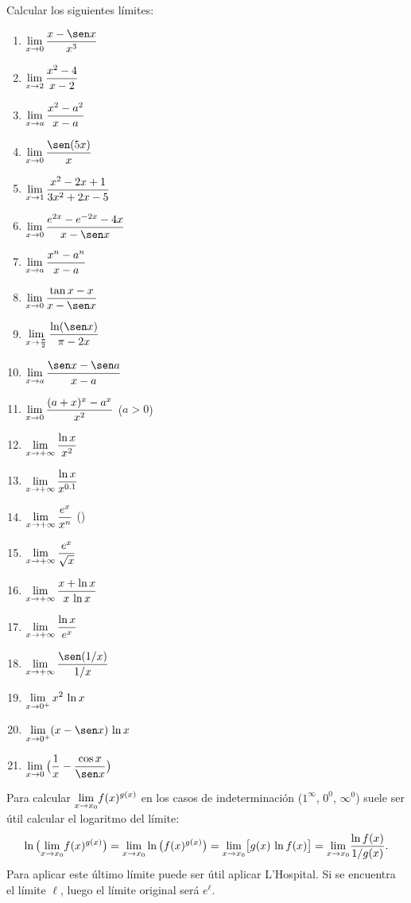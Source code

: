 \item Calcular los siguientes límites:
\begin{multicols}{2}
  \begin{enumerate}
    \item $\D \lim_{x\to 0} \frac{x-\sen x}{x^3}$
    \item $\displaystyle \lim_{x\to 2} \frac{x^2-4}{x-2}$
    \item $\displaystyle \lim_{x\to a} \frac{x^2-a^2}{x-a} $
    \item $\D \lim_{x\to 0} \frac{\sen (5x)}x$
    \item $\displaystyle \lim_{x\to 1} \frac{x^2-2x+1}{3x^2+2x-5} $
    \item $\D \lim_{x\to 0} \frac{e^{2x}-e^{-2x}-4x}{x-\sen x}$
    \item $\displaystyle \lim_{x\to a} \frac{x^n-a^n}{x-a}$
    \item $\D \lim_{x\to 0} \frac{\tan x-x}{x-\sen x}$
    \item $\D \lim_{x\to \frac\pi2} \frac{\ln(\sen x)}{\pi -2x}$
    \item $\D \lim_{x\to a} \frac{\sen x - \sen a}{x-a}$
    \item $\displaystyle \lim_{x\to 0} \frac{(a+x)^x-a^x}{x^2}$ ($a>0$)
    \item $\displaystyle \lim_{x\to +\infty} \frac{\ln x}{x^2}$
    \item $\displaystyle \lim_{x\to +\infty} \frac{\ln x}{x^{0.1}}$
    \item $\displaystyle \lim_{x\to +\infty} \frac{e^x}{x^n}$ (\niN)
    \item $\displaystyle \lim_{x\to +\infty} \frac{e^x}{\sqrt{x}}$
    \item $\displaystyle \lim_{x\to +\infty} \frac{x+\ln x}{x\, \ln x}$
    \item $\displaystyle \lim_{x\to +\infty} \frac{\ln x}{e^x}$
    \item $\D \lim_{x\to +\infty} \frac{\sen (1/x)}{1/x}$
    \item $\displaystyle \lim_{x\to 0^+} x^2 \, \ln x$
    \item $\D \lim_{x\to 0^+} (x-\sen x) \, \ln x$
    \item $\D \lim_{x\to 0} \big( \frac1x-\frac{\cos x}{\sen x}\big)$
  \end{enumerate}
\end{multicols}

\item Para calcular $\displaystyle{\ensuremath{\lim_{x\to x_0}}} f(x)^{g(x)}$ en los casos de indeterminación ($1^\infty$, $0^0$, $\infty^0$) suele ser útil calcular el logaritmo del límite:
\[
\ln \big({\lim_{x\to x_0}} f(x)^{g(x)}\big) = {\lim_{x\to x_0}} \ln \big(f(x)^{g(x)}\big)
= {\lim_{x\to x_0}} \big[ g(x) \, \ln f(x) \big] = {\lim_{x\to x_0}} \frac{\ln f(x)}{1/g(x)}.
\]
Para aplicar este último límite puede ser útil aplicar L'Hospital. Si se encuentra el límite $\ell$, luego el límite original será $e^\ell$.

